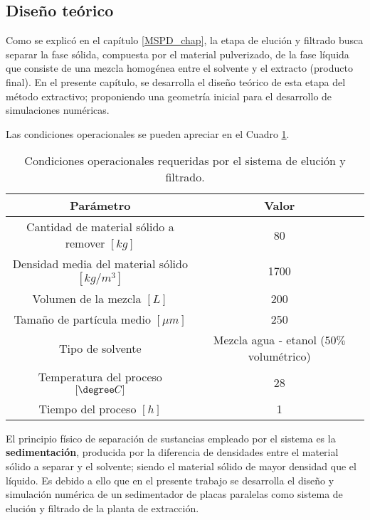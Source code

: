 \begin{center}
	\section{Dise\~no te\'orico} \label{teorico:sed}
\end{center}

\noindent
\justify

Como se explic\'o en el cap\'itulo \ref{MSPD_chap}, la etapa de eluci\'on y filtrado busca separar la fase s\'olida, compuesta por el material pulverizado, de la fase l\'iquida que consiste de una mezcla homog\'enea entre el solvente y el extracto (producto final). En el presente cap\'itulo, se desarrolla el dise\~no te\'orico de esta etapa del m\'etodo extractivo; proponiendo una geometr\'ia inicial para el desarrollo de simulaciones num\'ericas.

\noindent
\justify

Las condiciones operacionales se pueden apreciar en el Cuadro \ref{condiciones}.

\begin{table}[h!]
	\centering
	\begin{tabular}{c|c}
		\hline
		\textbf{Par\'ametro} & \textbf{Valor} \\ \hline
		Cantidad de material s\'olido a remover $[kg]$ & 80 \\ \hline
		Densidad media del material s\'olido $\left[kg / m^3 \right]$ & 1700 \\ \hline
		Volumen de la mezcla $[L]$ & 200 \\ \hline
		Tama\~no de part\'icula medio $[\mu m]$ & 250 \\ \hline
		Tipo de solvente & Mezcla agua - etanol ($50 \%$ volum\'etrico) \\ \hline
		Temperatura del proceso $[\degree C]$ & 28 \\ \hline
		Tiempo del proceso $[h]$ & 1 \\ \hline
		
	\end{tabular}
	\caption{Condiciones operacionales requeridas por el sistema de eluci\'on y filtrado.}
	\label{condiciones}
\end{table}

\noindent
\justify

El principio f\'isico de separaci\'on de sustancias empleado por el sistema es la \textbf{sedimentaci\'on}, producida por la diferencia de densidades entre el material s\'olido a separar y el solvente; siendo el material s\'olido de mayor densidad que el l\'iquido. Es debido a ello que en el presente trabajo se desarrolla el dise\~no y simulaci\'on num\'erica de un sedimentador de placas paralelas como sistema de eluci\'on y filtrado de la planta de extracci\'on.

